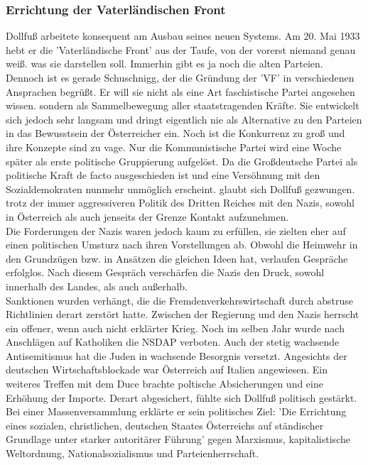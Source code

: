 \documentclass[letterpaper, 12pt]{article}
\let\tempsubsubsection\subsubsection
\renewcommand\subsubsection[1]{\vspace{0cm}\tempsubsubsection{#1}\vspace{0cm}}
\begin{document}
\subsubsection{Errichtung der Vaterländischen Front}
Dollfuß arbeitete konsequent am Ausbau seines neuen Systems. Am 20. Mai 1933 hebt er die 'Vaterländische Front' aus der
Taufe, von der vorerst niemand genau weiß. was sie darstellen
soll. Immerhin gibt es ja noch die alten Parteien. Dennoch ist es
gerade Schuschnigg, der die Gründung der 'VF' in verschiedenen Ansprachen begrüßt. Er will sie nicht als eine Art faschistische Partei angesehen wissen. sondern als Sammelbewegung aller staatstragenden Kräfte. Sie entwickelt sich jedoch sehr langsam und dringt eigentlich nie als Alternative zu den Parteien in
das Bewusstsein der Österreicher ein. Noch ist die Konkurrenz zu
groß und ihre Konzepte sind zu vage. Nur die Kommunistische
Partei wird eine Woche später als erste politische Gruppierung
aufgelöst.
Da die Großdeutsche Partei als politische Kraft de facto ausgeschieden ist und eine Versöhnung mit den Sozialdemokraten
nunmehr unmöglich erscheint. glaubt sich Dollfuß gezwungen.
trotz der immer aggressiveren Politik des Dritten Reiches mit
den Nazis, sowohl in Österreich als auch jenseits der Grenze
Kontakt aufzunehmen. \\
Die Forderungen der Nazis waren jedoch kaum zu erfüllen, sie zielten eher auf einen politischen Umsturz nach ihren Vorstellungen ab. Obwohl die Heimwehr in den Grundzügen bzw. in Ansätzen die gleichen Ideen hat, verlaufen Gespräche erfolglos. Nach diesem Gespräch verschärfen die Nazis den Druck, sowohl innerhalb des Landes, als auch außerhalb. \\
Sanktionen wurden verhängt, die die Fremdenverkehrswirtschaft durch abstruse Richtlinien derart zerstört hatte. Zwischen der Regierung und den Nazis herrscht ein offener, wenn auch nicht erklärter Krieg. Noch im selben Jahr wurde nach Anschlägen auf Katholiken die NSDAP verboten. Auch der stetig wachsende Antisemitismus hat die Juden in wachsende Besorgnis versetzt. Angesichts der deutschen Wirtschaftsblockade war Österreich auf Italien angewiesen. Ein weiteres Treffen mit dem Duce brachte poltische Absicherungen und eine Erhöhung der Importe. \clearpage
Derart abgesichert, fühlte sich Dollfuß politisch gestärkt. Bei einer Massenversammlung erklärte er sein politisches Ziel: 'Die Errichtung eines sozialen, christlichen, deutschen Staates Österreichs auf ständischer Grundlage unter starker autoritärer Führung' gegen Marxismus, kapitalistische Weltordnung, Nationalsozialismus und Parteienherrschaft.
\end{document}
